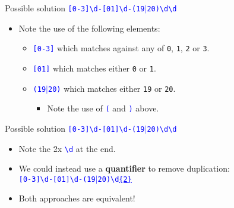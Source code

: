 \documentclass[
	usenames,
	dvipsnames,
	handout
] {beamer}
\newcommand{\reDigit}{\textbackslash{}d}
\newcommand{\rePattern}[1]{{\Large\texttt{\textcolor{blue}{#1}}}}
\begin{document}
\begin{frame}{Possible solution}
	\hspace*{3em}
	\rePattern{[0-3]\reDigit-[01]\reDigit-(19$|$20)\reDigit\reDigit}
	\pause
	\bigskip
	
	\begin{itemize}[label=\textbullet]
		\item Note the use of the following elements: \\
		      \pause
		      \medskip
		      \begin{itemize}[label=\textendash]
			      	\item \rePattern{[0-3]} which matches against any of \texttt{0}, \texttt{1}, \texttt{2} or \texttt{3}. \\
			      	      \pause
			      	      \medskip
			      	\item \rePattern{[01]} which matches either \texttt{0} or \texttt{1}. \\
			      	      \pause
			      	      \medskip
			      	\item \rePattern{(19$|$20)} which matches either \texttt{19} or \texttt{20}. \\
					\begin{itemize}
						\item [] \footnotesize Note the use of \rePattern{(} and \rePattern{)} above.
			      		\end{itemize}
		      \end{itemize} 
	\end{itemize}  
\end{frame}
    
\begin{frame}{Possible solution}
	\hspace*{3em}
	\rePattern{[0-3]\reDigit-[01]\reDigit-(19$|$20)\reDigit\reDigit}
		\pause
	\bigskip

	\begin{itemize}[label=\textbullet]
		\item Note the 2x \rePattern{\reDigit} at the end.
		      \pause
		\item We could instead use a \textbf{quantifier} to remove duplication: \\
		      \bigskip
		      \hspace*{3em}
		      \rePattern{[0-3]\reDigit-[01]\reDigit-(19$|$20)\reDigit\underline{\{2\}}}
		      		\pause
		      \bigskip
		\item Both approaches are equivalent!
	\end{itemize}  
\end{frame}
    
\end{document}
